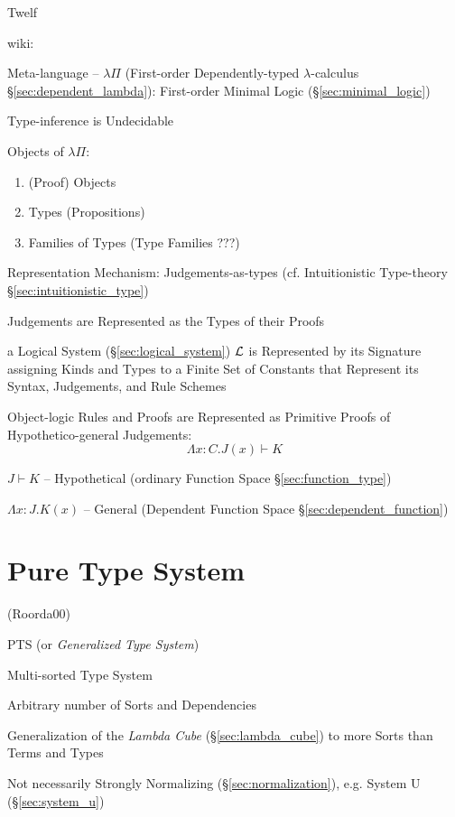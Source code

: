 Twelf


wiki:

Meta-language -- $\lambda\Pi$ (First-order Dependently-typed
$\lambda$-calculus \S\ref{sec:dependent_lambda}): First-order Minimal
Logic (\S\ref{sec:minimal_logic})

\fist Type-inference is Undecidable %

Objects of $\lambda\Pi$:
\begin{enumerate}
  \item (Proof) Objects
  \item Types (Propositions)
  \item Families of Types (Type Families ???)
\end{enumerate}

Representation Mechanism: Judgements-as-types (cf. Intuitionistic
Type-theory \S\ref{sec:intuitionistic_type})

Judgements are Represented as the Types of their Proofs

a Logical System (\S\ref{sec:logical_system}) $\mathcal{L}$ is
Represented by its Signature assigning Kinds and Types to a Finite Set
of Constants that Represent its Syntax, Judgements, and Rule Schemes

Object-logic Rules and Proofs are Represented as Primitive Proofs of
Hypothetico-general Judgements:
\[
  \Lambda x:C.J(x) \vdash K
\]

$J \vdash K$ -- Hypothetical (ordinary Function Space
\S\ref{sec:function_type})

$\Lambda x:J.K(x)$ -- General (Dependent Function Space
\S\ref{sec:dependent_function})



\section{Pure Type System}\label{sec:pts}

(Roorda00) %

PTS (or \emph{Generalized Type System})

Multi-sorted Type System

Arbitrary number of Sorts and Dependencies

Generalization of the \emph{Lambda Cube} (\S\ref{sec:lambda_cube}) to
more Sorts than Terms and Types

Not necessarily Strongly Normalizing (\S\ref{sec:normalization}), e.g.
System U (\S\ref{sec:system_u})


